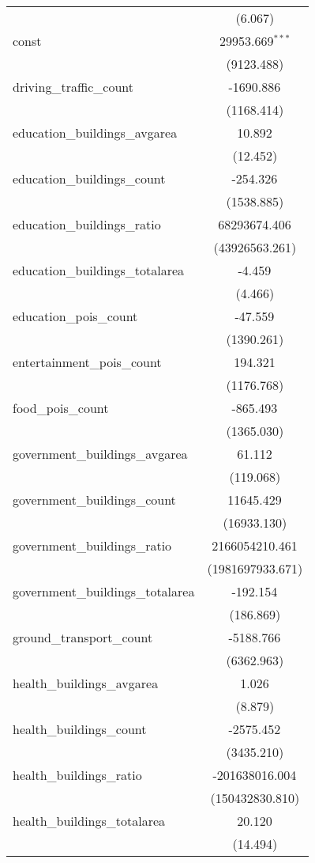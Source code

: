\begin{table}[!htbp]
\begin{tabular}{@{\extracolsep{5pt}}lc}
  & (6.067) \\
 const & 29953.669$^{***}$ \\
  & (9123.488) \\
 driving_traffic_count & -1690.886$^{}$ \\
  & (1168.414) \\
 education_buildings_avgarea & 10.892$^{}$ \\
  & (12.452) \\
 education_buildings_count & -254.326$^{}$ \\
  & (1538.885) \\
 education_buildings_ratio & 68293674.406$^{}$ \\
  & (43926563.261) \\
 education_buildings_totalarea & -4.459$^{}$ \\
  & (4.466) \\
 education_pois_count & -47.559$^{}$ \\
  & (1390.261) \\
 entertainment_pois_count & 194.321$^{}$ \\
  & (1176.768) \\
 food_pois_count & -865.493$^{}$ \\
  & (1365.030) \\
 government_buildings_avgarea & 61.112$^{}$ \\
  & (119.068) \\
 government_buildings_count & 11645.429$^{}$ \\
  & (16933.130) \\
 government_buildings_ratio & 2166054210.461$^{}$ \\
  & (1981697933.671) \\
 government_buildings_totalarea & -192.154$^{}$ \\
  & (186.869) \\
 ground_transport_count & -5188.766$^{}$ \\
  & (6362.963) \\
 health_buildings_avgarea & 1.026$^{}$ \\
  & (8.879) \\
 health_buildings_count & -2575.452$^{}$ \\
  & (3435.210) \\
 health_buildings_ratio & -201638016.004$^{}$ \\
  & (150432830.810) \\
 health_buildings_totalarea & 20.120$^{}$ \\
  & (14.494) \\

\end{tabular}
\end{table}
